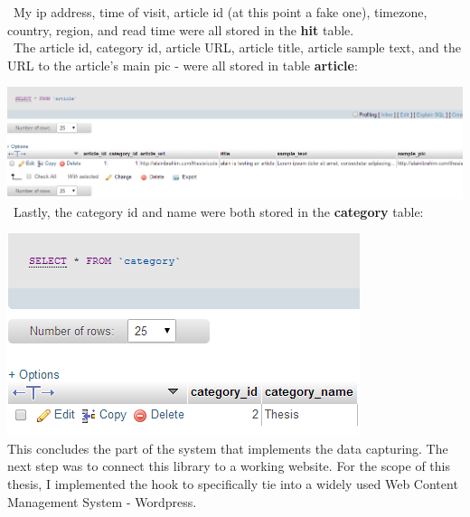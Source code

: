 \documentclass[12pt]{article}
\begin{document}
\noindent\ My ip address, time of visit, article id (at this point a fake one), timezone, country, region, and read time were all stored in the \textbf{hit} table.\\


\noindent\ The article id, category id, article URL, article title, article sample text, and the URL to the article's main pic - were all stored in table \textbf{article}:

\noindent\includegraphics[scale=0.5]{img/visit3} \\

\noindent\ Lastly, the category id and name were both stored in the \textbf{category} table:

\noindent\includegraphics[scale=0.7]{img/visit4} \\


This concludes the part of the system that implements the data capturing. The next step was to connect this library to a working website. For the scope of this thesis, I implemented the hook to specifically tie into a widely used Web Content Management System - Wordpress. 

\newpage
\end{document}
